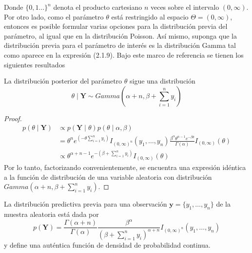     Donde $\{0,1\ldots\}^n$ denota el producto cartesiano $n$ veces sobre el intervalo $(0,\infty)$. Por otro lado, como el par\'ametro $\theta$ est\'a restringido al espacio $\Theta=(0,\infty)$, entonces es posible formular varias opciones para la distribuci\'on previa del par\'ametro, al igual que en la distribuci\'on Poisson. As\'i mismo, suponga que la distribuci\'on previa para el par\'ametro de inter\'es es la distribuci\'on Gamma tal como aparece en la expresi\'on (2.1.9). Bajo este marco de referencia se tienen los siguientes resultados
    
    \begin{Res}
    La distribuci\'on posterior del par\'ametro $\theta$ sigue una distribuci\'on
    \begin{equation*}
    \theta \mid \mathbf{Y} \sim Gamma\left(\alpha+n,\beta+\sum_{i=1}^ny_i\right)
    \end{equation*}
    \end{Res}
    
    \begin{proof}
    \begin{align*}
    p(\theta \mid \mathbf{Y})&\propto p(\mathbf{Y} \mid \theta)p(\theta \mid \alpha,\beta)\\
    &=\theta^n e^{(-\theta \sum_{i=1}^ny_i)}I_{(0,\infty)^n}(y_1,\ldots,y_n)\frac{\beta^\alpha \theta^{\alpha-1} e^{-\beta\theta}}{\Gamma(\alpha)}I_{(0,\infty)}(\theta)\\
    &\propto \theta^{\alpha+n-1}e^{-(\beta+\sum_{i=1}^ny_i)}I_{(0,\infty)}(\theta)
    \end{align*}
    Por lo tanto, factorizando convenientemente, se encuentra una expresi\'on id\'entica a la funci\'on de distribuci\'on de una variable aleatoria con distribuci\'on $Gamma(\alpha+n,\beta+\sum_{i=1}^ny_i)$.
    \end{proof}
    
    \begin{Res}
    La distribuci\'on predictiva previa para una observaci\'on $\mathbf{y}=\{y_1,\ldots,y_n\}$ de la muestra aleatoria est\'a dada por
    \begin{equation}
    p(\mathbf{Y})=\frac{\Gamma(\alpha+n)}{\Gamma(\alpha)}\frac{\beta^\alpha}{(\beta+\sum_{i=1}^ny_i)^{\alpha+n}}
    I_{(0,\infty)^n}(y_1,\ldots,y_n)
    \end{equation}
    y define una aut\'entica funci\'on de densidad de probabilidad continua.
    \end{Res}
    
